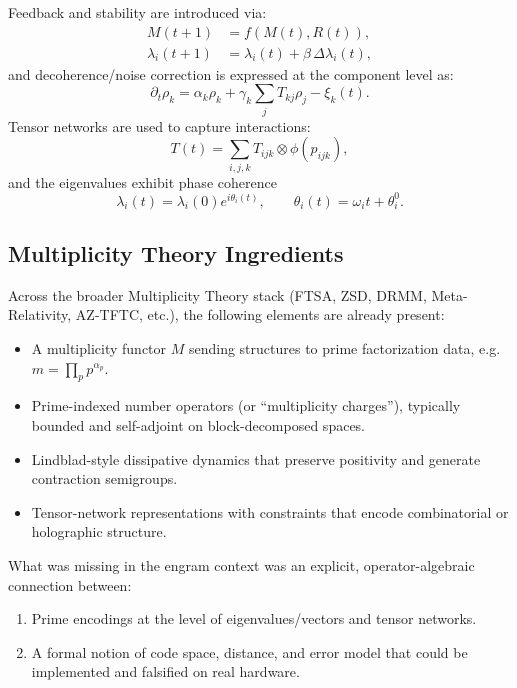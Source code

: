\documentclass[11pt]{article}
\begin{document}
Feedback and stability are introduced via:
\begin{align}
  M(t+1) &= f(M(t), R(t)), \\
  \lambda_i(t+1) &= \lambda_i(t) + \beta \,\Delta\lambda_i(t),
\end{align}
and decoherence/noise correction is expressed at the component level as:
\begin{equation}
  \partial_t \rho_k
  = \alpha_k \rho_k + \gamma_k \sum_j T_{kj} \rho_j
    - \xi_k(t).
\end{equation}
Tensor networks are used to capture interactions:
\begin{equation}
  T(t) = \sum_{i,j,k} T_{ijk} \otimes \phi(p_{ijk}),
\end{equation}
and the eigenvalues exhibit phase coherence
\begin{equation}
  \lambda_i(t) = \lambda_i(0) e^{i \theta_i(t)},
  \qquad
  \theta_i(t) = \omega_i t + \theta_i^0.
\end{equation}

\subsection{Multiplicity Theory Ingredients}

Across the broader Multiplicity Theory stack (FTSA, ZSD, DRMM, Meta-Relativity,
AZ-TFTC, etc.), the following elements are already present:
\begin{itemize}[leftmargin=*]
  \item A multiplicity functor $M$ sending structures to prime factorization
        data, e.g.\ $m = \prod_p p^{\alpha_p}$.
  \item Prime-indexed number operators (or ``multiplicity charges''),
        typically bounded and self-adjoint on block-decomposed spaces.
  \item Lindblad-style dissipative dynamics that preserve positivity and
        generate contraction semigroups.
  \item Tensor-network representations with constraints that encode
        combinatorial or holographic structure.
\end{itemize}

What was missing in the engram context was an explicit, operator-algebraic
connection between:
\begin{enumerate}[leftmargin=*]
  \item Prime encodings at the level of eigenvalues/vectors and tensor
        networks.
  \item A formal notion of code space, distance, and error model that could
        be implemented and falsified on real hardware.
\end{enumerate}
\end{document}
